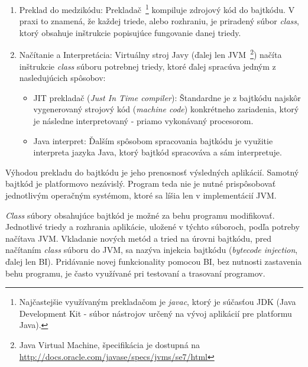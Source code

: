 \documentclass[11pt,final,oneside]{fithesis}
\begin{document}
\begin{enumerate}
\item Preklad do medzikódu: Prekladač~\footnote{Najčastejšie využívaným
prekladačom je \textit{javac}, ktorý je súčasťou JDK (Java Development
Kit - súbor nástrojov určený na vývoj aplikácií pre platformu Java).}
kompiluje zdrojový kód do bajtkódu. V praxi to znamená, že každej triede, alebo
rozhraniu, je priradený súbor \textit{class}, ktorý obsahuje inštrukcie
popisujúce fungovanie danej triedy. 
\item Načítanie a Interpretácia: Virtuálny
stroj Javy (ďalej len JVM~\footnote{Java Virtual Machine, špecifikácia je
dostupná na \url{http://docs.oracle.com/javase/specs/jvms/se7/html}}) načíta
inštrukcie \textit{class} súboru potrebnej triedy, ktoré ďalej spracúva jedným
z nasledujúcich spôsobov:

\begin{itemize}
\item JIT prekladač (\textit{Just In Time compiler}): Štandardne je z
bajtkódu najskôr vygenerovaný strojový kód (\textit{machine code}) konkrétneho
zariadenia, ktorý je následne interpretovaný - priamo vykonávaný
procesorom.
\item Java interpret: Ďalším spôsobom spracovania bajtkódu je
využitie interpreta jazyka Java, ktorý bajtkód spracováva a sám
interpretuje.
\end{itemize}
\end{enumerate}

Výhodou prekladu do bajtkódu je jeho prenosnosť výsledných aplikácií.
Samotný bajtkód je platformovo nezávislý. Program teda nie je nutné 
prispôsobovať jednotlivým operačným systémom, ktoré sa líšia len v 
implementácií JVM.

\textit{Class} súbory obsahujúce bajtkód je možné za behu programu modifikovať.
Jednotlivé triedy a rozhrania aplikácie, uložené v týchto súboroch, podľa 
potreby načítava JVM. Vkladanie nových metód a tried na úrovni bajtkódu, pred
načítaním \textit{class} súboru do JVM, sa nazýva injekcia bajtkódu
(\textit{bytecode injection}, ďalej len BI). Pridávanie novej funkcionality
pomocou BI, bez nutnosti zastavenia behu programu, je často využívané pri
testovaní a trasovaní programov.
\end{document}
